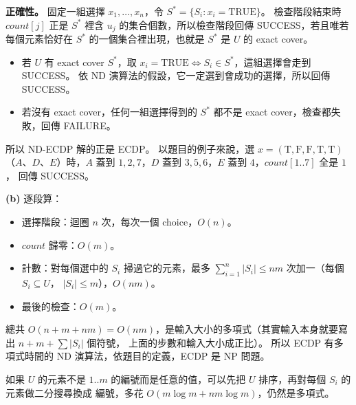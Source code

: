 \begin{pastsoln}
\textbf{正確性。} 固定一組選擇 $x_1, \ldots, x_n$，令 $S^* = \{S_i : x_i = \text{TRUE}\}$。 檢查階段結束時
$\mathit{count}[j]$ 正是 $S^*$ 裡含 $u_j$ 的集合個數，所以檢查階段回傳 SUCCESS，若且唯若每個元素恰好在
$S^*$ 的一個集合裡出現，也就是 $S^*$ 是 $U$ 的 exact cover。
\begin{itemize}
\item 若 $U$ 有 exact cover $S^*$，取 $x_i = \text{TRUE} \iff S_i \in S^*$，這組選擇會走到 SUCCESS。 依
ND 演算法的假設，它一定選到會成功的選擇，所以回傳 SUCCESS。
\item 若沒有 exact cover，任何一組選擇得到的 $S^*$ 都不是 exact cover，檢查都失敗，回傳 FAILURE。
\end{itemize}
所以 ND-ECDP 解的正是 ECDP。 以題目的例子來說，選 $x = (\text{T}, \text{F}, \text{F}, \text{T}, \text{T})$
（$A$、$D$、$E$）時，$A$ 蓋到 $1, 2, 7$，$D$ 蓋到 $3, 5, 6$，$E$ 蓋到 $4$，$\mathit{count}[1..7]$ 全是 $1$，
回傳 SUCCESS。

\textbf{(b)} 逐段算：
\begin{itemize}
\item 選擇階段：迴圈 $n$ 次，每次一個 choice，$O(n)$。
\item $\mathit{count}$ 歸零：$O(m)$。
\item 計數：對每個選中的 $S_i$ 掃過它的元素，最多 $\sum_{i=1}^{n} |S_i| \le nm$ 次加一（每個 $S_i \subseteq U$，
$|S_i| \le m$），$O(nm)$。
\item 最後的檢查：$O(m)$。
\end{itemize}
總共 $O(n + m + nm) = O(nm)$，是輸入大小的多項式（其實輸入本身就要寫出 $n + m + \sum |S_i|$ 個符號，
上面的步數和輸入大小成正比）。 所以 ECDP 有多項式時間的 ND 演算法，依題目的定義，ECDP 是 NP 問題。

如果 $U$ 的元素不是 $1..m$ 的編號而是任意的值，可以先把 $U$ 排序，再對每個 $S_i$ 的元素做二分搜尋換成
編號，多花 $O(m \log m + nm \log m)$，仍然是多項式。
\end{pastsoln}
